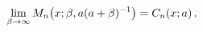\[\lim_{\beta\to\infty}\mathop{M_{n}\/}\nolimits\!\left(x;\beta,a(a+\beta)^{-1}%
\right)=\mathop{C_{n}\/}\nolimits\!\left(x;a\right).\]